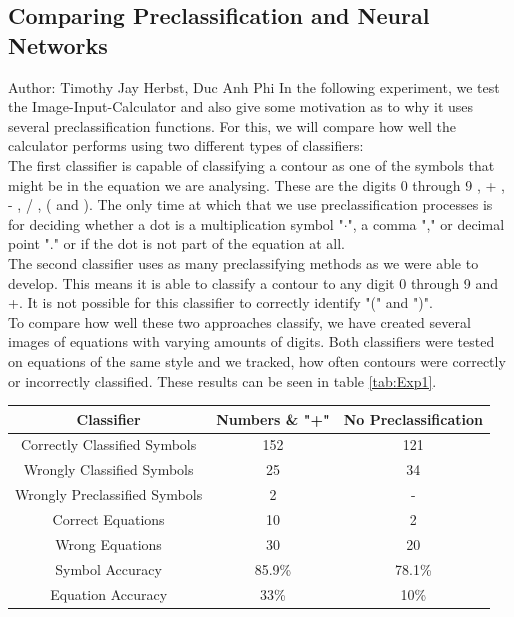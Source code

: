 \documentclass[12pt]{article}
\begin{document}
	\subsection{Comparing Preclassification and Neural Networks}
	\small{Author: Timothy Jay Herbst, Duc Anh Phi} \newline \newline
	In the following experiment, we test the Image-Input-Calculator and also give some motivation as to why it uses several preclassification functions.
	For this, we will compare how well the calculator performs using two different types of classifiers:\\
	The first classifier is capable of classifying a contour as one of the symbols that might be in the equation we are analysing.
	These are the digits 0 through 9 , + , - , / , ( and ).
	The only time at which that we use preclassification processes is for deciding whether a dot is a multiplication symbol "$\cdot$", a comma "," or decimal point "." or if the dot is not part of the equation at all.\\
	The second classifier uses as many preclassifying methods as we were able to develop.
	This means it is able to classify a contour to any digit 0 through 9 and +.
	It is not possible for this classifier to correctly identify "(" and ")".\\ %
	To compare how well these two approaches classify, we have created several images of equations with varying amounts of digits.
	Both classifiers were tested on equations of the same style and we tracked, how often contours were correctly or incorrectly classified.
	These results can be seen in table \ref{tab:Exp1}.
	
	
	
	\begin{center}
		\begin{tabular}{|c|| c | c|} 
			\hline
			 Classifier & Numbers \& "+" & No Preclassification \\
			\hline\hline
			Correctly Classified Symbols & 152 & 121 \\ 
			\hline
			Wrongly Classified Symbols& 25 & 34\\
			\hline
			Wrongly Preclassified Symbols & 2 & - \\
			\hline
			Correct Equations & 10 & 2\\
			\hline
			Wrong Equations & 30 & 20\\
			\hline
			Symbol Accuracy & 85.9\% & 78.1\% \\
			\hline
			Equation Accuracy & 33\% & 10\% \\
			\hline
		\end{tabular}\label{tab:Exp1}
	\end{center}
	
\end{document}
